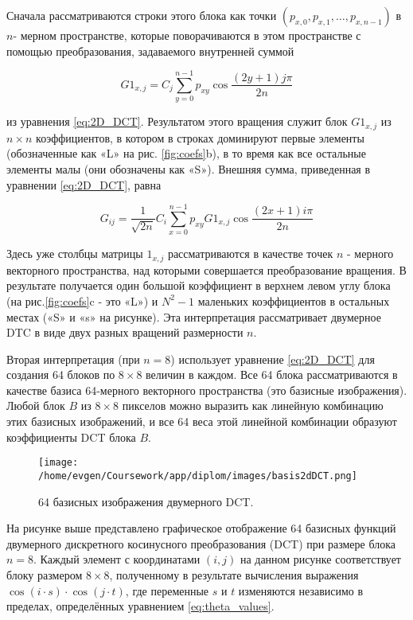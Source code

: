 Сначала рассматриваются строки этого блока как точки $(p_{x,0}, p_{x,1}, \dots, p_{x,n-1})$ в $n$- мерном пространстве,
которые поворачиваются в этом пространстве с помощью преобразования, задаваемого внутренней суммой

$$
G1_{x,j} = C_j \sum_{y=0}^{n-1} p_{xy} \cos{\frac{(2y+1)j \pi}{2n}}
$$


из уравнения \eqref{eq:2D_DCT}. Результатом этого вращения служит блок $G1_{x,j}$ из $n \times n$ коэффициентов, 
в котором в строках доминируют первые элементы (обозначенные как «L» на рис. \eqref{fig:coefs}b), 
в то время как все остальные элементы малы (они обозначены как «S»). Внешняя сумма, приведенная в уравнении \eqref{eq:2D_DCT}, равна


$$
G_{ij} = \frac{1}{\sqrt{2n}} C_i \sum_{x=0}^{n-1} p_{xy} G1_{x,j} \cos{\frac{(2x+1)i \pi}{2n}}
$$

Здесь уже столбцы матрицы $1_{x,j}$ рассматриваются в качестве то­чек $n$ - мерного векторного пространства, над которыми совершает­ся преобразование вращения. 
В результате получается один боль­шой коэффициент в верхнем левом углу блока (на рис.\eqref{fig:coefs}c - это «L») 
и $N^2 - 1$ маленьких коэффициентов в остальных местах («S» и «s» на рисунке). 
Эта интерпретация рассматривает двумерное DTC в виде двух разных вращений размерности $n$. 


Вторая интерпретация (при $n = 8$) использует уравнение \eqref{eq:2D_DCT} для создания 64 блоков по $8 \times 8$ величин в каждом. 
Все 64 блока рас­сматриваются в качестве базиса 64-мерного векторного простран­ства (это базисные изображения). 
Любой блок $B$ из $8 \times 8$ пикселов можно выразить как линейную комбинацию этих базисных изобра­жений, 
и все 64 веса этой линейной комбинации образуют коэффи­циенты DCT блока $B$.


\begin{figure}[h!]
    \centering
    \texttt{[image: /home/evgen/Coursework/app/diplom/images/basis2dDCT.png]}
    \caption{64 базисных изображения двумерного DCT.}
    \label{fig:basis2dDCT}
\end{figure}


На рисунке выше представлено графическое отображение 64 базисных функций 
двумерного дискретного косинусного преобразования (DCT) при размере блока $n=8$.
 Каждый элемент с координатами $(i,j)$ на данном рисунке соответствует блоку размером $8 \times 8$, 
 полученному в результате вычисления выражения $\cos{(i \cdot s)} \cdot \cos{(j \cdot t)}$, 
 где переменные $s$ и $t$ изменяются независимо в пределах, определённых уравнением \eqref{eq:theta_values}.\\


